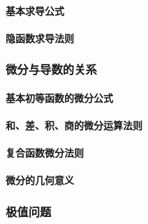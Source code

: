 \documentclass[
]{article}
\begin{document}
\hypertarget{ux57faux672cux6c42ux5bfcux516cux5f0f}{%
\paragraph{基本求导公式}\label{ux57faux672cux6c42ux5bfcux516cux5f0f}}

\hypertarget{ux9690ux51fdux6570ux6c42ux5bfcux6cd5ux5219}{%
\paragraph{隐函数求导法则}\label{ux9690ux51fdux6570ux6c42ux5bfcux6cd5ux5219}}

\hypertarget{ux5faeux5206ux4e0eux5bfcux6570ux7684ux5173ux7cfb}{%
\subsubsection{微分与导数的关系}\label{ux5faeux5206ux4e0eux5bfcux6570ux7684ux5173ux7cfb}}

\hypertarget{ux57faux672cux521dux7b49ux51fdux6570ux7684ux5faeux5206ux516cux5f0f}{%
\paragraph{基本初等函数的微分公式}\label{ux57faux672cux521dux7b49ux51fdux6570ux7684ux5faeux5206ux516cux5f0f}}

\hypertarget{ux548cux5deeux79efux5546ux7684ux5faeux5206ux8fd0ux7b97ux6cd5ux5219}{%
\paragraph{和、差、积、商的微分运算法则}\label{ux548cux5deeux79efux5546ux7684ux5faeux5206ux8fd0ux7b97ux6cd5ux5219}}

\hypertarget{ux590dux5408ux51fdux6570ux5faeux5206ux6cd5ux5219}{%
\paragraph{复合函数微分法则}\label{ux590dux5408ux51fdux6570ux5faeux5206ux6cd5ux5219}}

\hypertarget{ux5faeux5206ux7684ux51e0ux4f55ux610fux4e49}{%
\paragraph{微分的几何意义}\label{ux5faeux5206ux7684ux51e0ux4f55ux610fux4e49}}

\hypertarget{ux6781ux503cux95eeux9898}{%
\subsubsection{极值问题}\label{ux6781ux503cux95eeux9898}}
\end{document}
